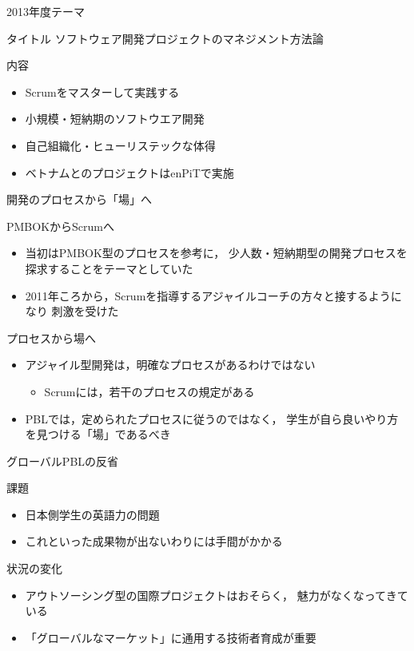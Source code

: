 \documentclass[t]{beamer}
\begin{document}
\begin{frame}[label=sec-4]{2013年度テーマ}
\begin{block}{タイトル}
ソフトウェア開発プロジェクトのマネジメント方法論
\end{block}
\begin{block}{内容}
\begin{itemize}
\item Scrumをマスターして実践する
\item 小規模・短納期のソフトウエア開発
\item 自己組織化・ヒューリステックな体得
\item ベトナムとのプロジェクトはenPiTで実施
\end{itemize}
\end{block}
\end{frame}

\begin{frame}[label=sec-5]{開発のプロセスから「場」へ}
\begin{block}{PMBOKからScrumへ}
\begin{itemize}
\item 当初はPMBOK型のプロセスを参考に，
少人数・短納期型の開発プロセスを探求することをテーマとしていた
\item 2011年ころから，Scrumを指導するアジャイルコーチの方々と接するようになり
刺激を受けた
\end{itemize}
\end{block}
\begin{block}{プロセスから場へ}
\begin{itemize}
\item アジャイル型開発は，明確なプロセスがあるわけではない
\begin{itemize}
\item Scrumには，若干のプロセスの規定がある
\end{itemize}
\item PBLでは，定められたプロセスに従うのではなく，
学生が自ら良いやり方を見つける「場」であるべき
\end{itemize}
\end{block}
\end{frame}

\begin{frame}[label=sec-6]{グローバルPBLの反省}
\begin{block}{課題}
\begin{itemize}
\item 日本側学生の英語力の問題
\item これといった成果物が出ないわりには手間がかかる
\end{itemize}
\end{block}
\begin{block}{状況の変化}
\begin{itemize}
\item アウトソーシング型の国際プロジェクトはおそらく，
魅力がなくなってきている
\item 「グローバルなマーケット」に通用する技術者育成が重要
\end{itemize}
\end{block}
\end{frame}
\end{document}
